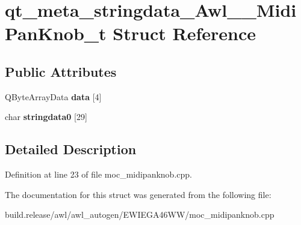 \hypertarget{structqt__meta__stringdata___awl_____midi_pan_knob__t}{}\section{qt\+\_\+meta\+\_\+stringdata\+\_\+\+Awl\+\_\+\+\_\+\+Midi\+Pan\+Knob\+\_\+t Struct Reference}
\label{structqt__meta__stringdata___awl_____midi_pan_knob__t}
\subsection*{Public Attributes}
\begin{DoxyCompactItemize}
\item 
\mbox{\label{structqt__meta__stringdata___awl_____midi_pan_knob__t_ab5a7ffca79237b5bd2539870783ec121}} 
Q\+Byte\+Array\+Data {\bfseries data} \mbox{[}4\mbox{]}
\item 
\mbox{\label{structqt__meta__stringdata___awl_____midi_pan_knob__t_a72b395c89777c11cc12d10916aa2eae6}} 
char {\bfseries stringdata0} \mbox{[}29\mbox{]}
\end{DoxyCompactItemize}


\subsection{Detailed Description}


Definition at line 23 of file moc\+\_\+midipanknob.\+cpp.



The documentation for this struct was generated from the following file\+:\begin{DoxyCompactItemize}
\item 
build.\+release/awl/awl\+\_\+autogen/\+E\+W\+I\+E\+G\+A46\+W\+W/moc\+\_\+midipanknob.\+cpp\end{DoxyCompactItemize}
